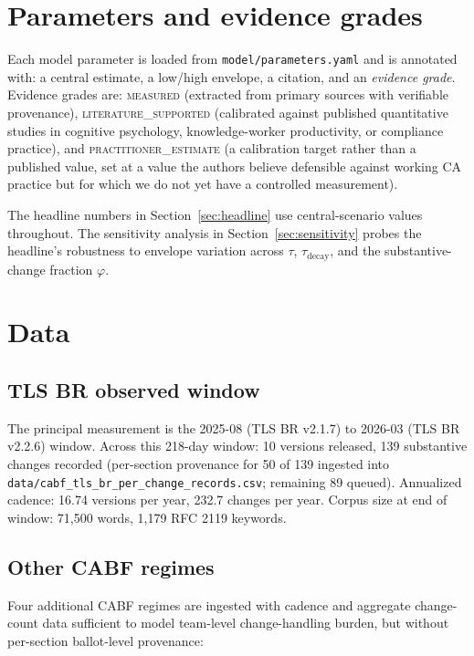 \documentclass[11pt,letterpaper]{article}
\begin{document}
\section{Parameters and evidence grades}
\label{sec:parameters}

Each model parameter is loaded from \texttt{model/parameters.yaml} and is annotated with: a central estimate, a low/high envelope, a citation, and an \textit{evidence grade}. Evidence grades are: \textsc{measured} (extracted from primary sources with verifiable provenance), \textsc{literature\_supported} (calibrated against published quantitative studies in cognitive psychology, knowledge-worker productivity, or compliance practice), and \textsc{practitioner\_estimate} (a calibration target rather than a published value, set at a value the authors believe defensible against working CA practice but for which we do not yet have a controlled measurement).

The headline numbers in Section~\ref{sec:headline} use central-scenario values throughout. The sensitivity analysis in Section~\ref{sec:sensitivity} probes the headline's robustness to envelope variation across $\tau$, $\tau_{\text{decay}}$, and the substantive-change fraction $\varphi$.

\section{Data}
\label{sec:data}

\subsection{TLS BR observed window}

The principal measurement is the 2025-08 (TLS BR v2.1.7) to 2026-03 (TLS BR v2.2.6) window. Across this 218-day window: 10 versions released, 139 substantive changes recorded (per-section provenance for 50 of 139 ingested into \texttt{data/cabf\_tls\_br\_per\_change\_records.csv}; remaining 89 queued). Annualized cadence: 16.74 versions per year, 232.7 changes per year. Corpus size at end of window: 71{,}500 words, 1{,}179 RFC 2119 keywords.

\subsection{Other CABF regimes}

Four additional CABF regimes are ingested with cadence and aggregate change-count data sufficient to model team-level change-handling burden, but without per-section ballot-level provenance:
\end{document}
